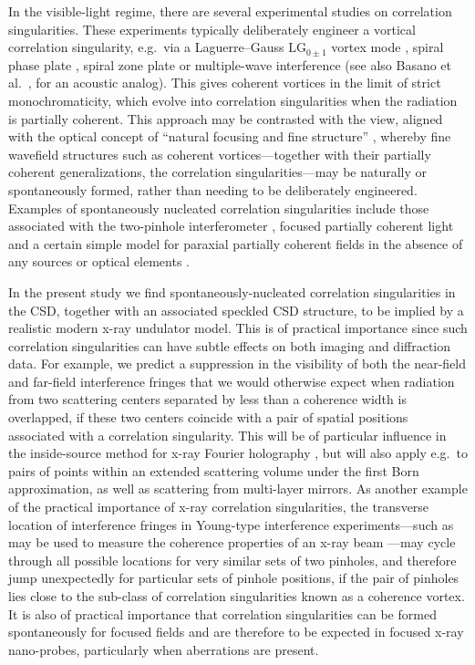 \documentclass[%
 reprint,
 amsmath,amssymb,
 aps,
]{revtex4-1}
\begin{document}
In the visible-light regime, there are several   experimental studies on correlation singularities. These experiments typically deliberately engineer a vortical correlation singularity, e.g.~via a Laguerre--Gauss ${\textrm{LG}}_{0 \pm 1}$ vortex mode \cite{Bogatyryova2003}, spiral phase plate \cite{Palacios2004},  spiral zone plate \cite{Wang2006} or multiple-wave interference \cite{Ambrosini2005} (see also Basano et al.~\cite{Basano2005}, for an acoustic analog).  This gives coherent vortices in the limit of strict monochromaticity, which evolve into correlation singularities when the radiation is partially coherent.  This approach may be contrasted with the view, aligned with the optical concept of ``natural focusing and fine structure'' \cite{Nye1999}, whereby fine wavefield structures such as coherent vortices---together with their partially coherent generalizations, the correlation singularities---may be naturally or spontaneously formed, rather than needing to be deliberately engineered.  Examples of spontaneously nucleated correlation singularities include those associated with the two-pinhole interferometer \cite{Schouten2003}, focused partially coherent light \cite{FischerVisser2004} and a certain simple model for paraxial partially coherent fields in the absence of any sources or optical elements \cite{PellicciaPaganin2012}.

In the present study we find spontaneously-nucleated correlation singularities in the CSD, together with an associated speckled CSD structure, to be implied by a realistic modern x-ray undulator model. This is of practical importance since such correlation singularities can have subtle effects on both imaging and diffraction data. For example, we predict a suppression in the visibility of both the near-field and far-field interference fringes that we would otherwise expect when radiation from two scattering centers separated by less than a coherence width is overlapped, if these two centers coincide with a pair of spatial positions associated with a correlation singularity.  This will be of particular influence in the inside-source method for x-ray Fourier holography \cite{FaigelTegze1999}, but will also apply e.g.~to pairs of points within an extended scattering volume under the first Born approximation, as well as scattering from multi-layer mirrors. As another example of the practical importance of x-ray correlation singularities, the transverse location of interference fringes in Young-type interference experiments---such as may be used to measure the coherence properties of an x-ray beam \cite{Ditmire1996,Takayama1998,Leitenberger1,Leitenberger2,Leitenberger3}---may cycle through all possible locations for very similar sets of two pinholes, and therefore jump unexpectedly for particular sets of pinhole positions, if the pair of pinholes lies close to the sub-class of correlation singularities known as a coherence vortex.  It is also of practical importance that correlation singularities can be formed spontaneously for focused fields \cite{FischerVisser2004} and are therefore to be expected in focused x-ray nano-probes, particularly when aberrations are present.
\end{document}
